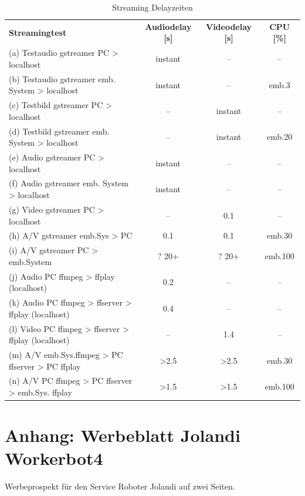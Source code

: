 \begin{table}[H]
\centering
 \begin{tabular}{l|c|c|c}
 \textbf{Streamingtest}&\textbf{Audiodelay [s]}&\textbf{Videodelay [s]} & \textbf{CPU [\%]}\\
\cline{1-4} 
 (a) Testaudio gstreamer PC > localhost          & instant   & --    & --\\
 (b) Testaudio gstreamer emb. System > localhost & instant   & --    & emb.3\\
 (c) Testbild gstreamer PC > localhost           & --        & instant & --\\
 (d) Testbild gstreamer emb. System > localhost  & --        & instant & emb.20\\                        
 (e) Audio gstreamer PC > localhost              & instant   & --    & --\\
 (f) Audio gstreamer emb. System > localhost     & instant   & --    & --\\
 (g) Video gstreamer PC > localhost              & --        & 0.1   & --\\
 (h) A/V gstreamer emb.Sys > PC                  & 0.1       & 0.1   & emb.30\\
 (i) A/V gstreamer PC > emb.System               & ? 20+     & ? 20+ & emb.100\\ 
 \cline{1-4}
 (j) Audio PC ffmpeg > ffplay (localhost)            & 0.2   & --   & --\\
 (k) Audio PC ffmpeg > ffserver > ffplay (localhost) & 0.4   & --   & --\\
 (l) Video PC ffmpeg > ffserver > ffplay (localhost) & --    & 1.4  & --\\
 (m) A/V emb.Sys.ffmpeg > PC ffserver > PC ffplay    & >2.5  & >2.5 & emb.30\\
 (n) A/V PC ffmpeg > PC ffserver > emb.Sys. ffplay   & >1.5  & >1.5 & emb.100\\
\end{tabular}

     \caption{Streaming Delayzeiten}
     \label{tbl:beispieltabelle}
   \end{table}

\newpage
\section{Anhang: Werbeblatt Jolandi Workerbot4} \label{RefAnhang}
Werbeprospekt für den Service Roboter Jolandi auf zwei Seiten.\\

